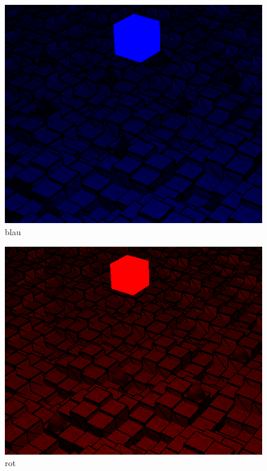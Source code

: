 \documentclass{article}
\begin{document}
\begin{minipage}{0.5\textwidth}
\begin{minipage}{0.49\textwidth}
\begin{figure}[H]
    \includegraphics[scale=0.221]{lcolor3.png}
    \caption{blau}
\end{figure}
\end{minipage}
\begin{minipage}{0.25\textwidth}
\begin{figure}[H]
    \includegraphics[scale=0.192]{lcolor4.png}
    \caption{rot}
\end{figure}
\end{minipage}
\end{minipage}
\end{document}
